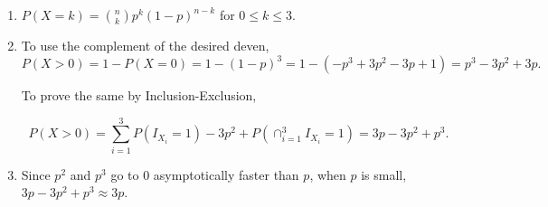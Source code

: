 \begin{enumerate}[label=(\alph*)]
\item $P(X=k) = \binom{n}{k}p^{k}(1-p)^{n-k}$ for $0 \leq k \leq 3$.

\item To use the complement of the desired deven, $$P(X > 0) = 1 - P(X = 0) = 1 -
(1- p)^{3} = 1 - (-p^{3} + 3p^{2} - 3p + 1) = p^{3} - 3p^{2} + 3p.$$

To prove the same by Inclusion-Exclusion,

$$P(X > 0) = \sum_{i=1}^{3} P(I_{X_{i}}=1) - 3p^{2} + P(\cap_{i=1}^{3}I_{X_
{i}} =
1) = 3p -3p^{2} + p^{3}.$$

\item Since $p^{2}$ and $p^{3}$ go to $0$ asymptotically faster than $p$, when
$p$ is small, $3p - 3p^{2} + p^{3} \approx 3p$.
\end{enumerate}